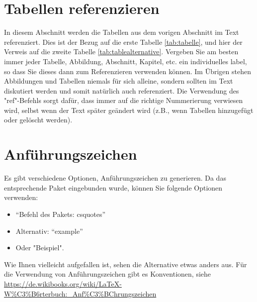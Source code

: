 \section{Tabellen referenzieren}
\label{sec:tabellen_ref}
In diesem Abschnitt werden die Tabellen aus dem vorigen Abschnitt im Text referenziert. Dies ist der Bezug auf die erste Tabelle \ref{tab:tabelle}, und hier der Verweis auf die zweite Tabelle \ref{tab:tablealternative}. Vergeben Sie am besten immer jeder Tabelle, Abbildung, Abschnitt, Kapitel, etc. ein individuelles label, so dass Sie dieses dann zum Referenzieren verwenden können. Im Übrigen stehen Abbildungen und Tabellen niemals für sich alleine, sondern sollten im Text diskutiert werden und somit natürlich auch referenziert. Die Verwendung des "ref{}"-Befehls sorgt dafür, dass immer auf die richtige Nummerierung verwiesen wird, selbst wenn der Text später geändert wird (z.B., wenn Tabellen hinzugefügt oder gelöscht werden). 

\section{Anführungszeichen}
\label{sec:Anfuehrungszeichen}

Es gibt verschiedene Optionen, Anführungszeichen zu generieren. Da das entsprechende Paket eingebunden wurde, können Sie folgende Optionen verwenden:

\begin{itemize}
	\item \enquote{Befehl des Pakets: csquotes}
	\item Alternativ: ``example''
	\item Oder "Beispiel". 
\end{itemize}

Wie Ihnen vielleicht aufgefallen ist, sehen die Alternative etwas anders aus. Für die Verwendung von Anführungszeichen gibt es Konventionen, siehe \url{https://de.wikibooks.org/wiki/LaTeX-W%C3%B6rterbuch:_Anf%C3%BChrungszeichen}





